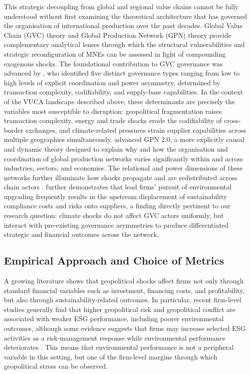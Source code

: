 \documentclass[12pt,a4paper]{article}
\begin{document}
This strategic decoupling from global and regional value chains cannot be fully understood without first examining the theoretical architecture that has governed the organisation of international production over the past decades. Global Value Chain (GVC) theory and Global Production Network (GPN) theory provide complementary analytical lenses through which the structural vulnerabilities and strategic reconfiguration of MNEs can be assessed in light of compounding exogenous shocks. The foundational contribution to GVC governance was advanced by \citet{gereffi2005}, who identified five distinct governance types ranging from low to high levels of explicit coordination and power asymmetry, determined by transaction complexity, codifiability, and supply-base capabilities. In the context of the VUCA landscape described above, these determinants are precisely the variables most susceptible to disruption: geopolitical fragmentation raises transaction complexity, energy and trade shocks erode the codifiability of cross-border exchanges, and climate-related pressures strain supplier capabilities across multiple geographies simultaneously. \citet{yeung2015} advanced GPN 2.0, a more explicitly causal and dynamic theory designed to explain why and how the organisation and coordination of global production networks varies significantly within and across industries, sectors, and economies. The relational and power dimensions of these networks further illuminate how shocks propagate and are redistributed across chain actors \citep{kano2018, humphrey2002}. \citet{ponte2022} further demonstrates that lead firms' pursuit of environmental upgrading frequently results in the upstream displacement of sustainability compliance costs and risks onto suppliers, a finding directly pertinent to our research question: climate shocks do not affect GVC actors uniformly, but interact with pre-existing governance asymmetries to produce differentiated strategic and financial outcomes across the network.

\subsection{Empirical Approach and Choice of Metrics}

A growing literature shows that geopolitical shocks affect firms not only through standard financial variables such as investment, financing costs, and profitability, but also through sustainability-related outcomes. In particular, recent firm-level studies generally find that higher geopolitical risk and geopolitical conflict are associated with weaker ESG performance, including poorer environmental outcomes, although some evidence suggests that firms may increase selected ESG activities as a risk-management response while environmental performance deteriorates  \citep{abdullah2024, saharti2024, erzurumlu2025}. This means that environmental performance is not a peripheral variable in this setting, but one of the firm-level margins through which geopolitical stress can be observed.
\end{document}
